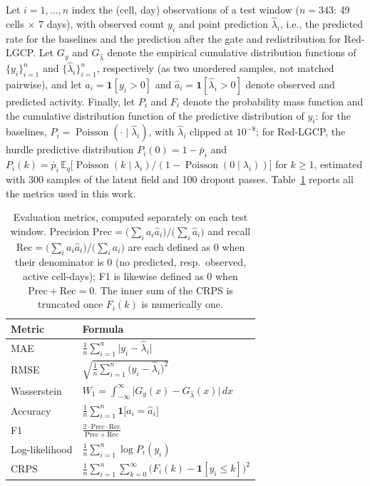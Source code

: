 Let $i=1,\dots,n$ index the (cell, day) observations of a test window ($n=343$: 49 cells $\times$ 7 days), with observed count $y_i$ and point prediction $\hat\lambda_i$, i.e., the predicted rate for the baselines and the prediction after the gate and redistribution for Red-LGCP. Let $G_y$ and $G_{\hat\lambda}$ denote the empirical cumulative distribution functions of $\{y_i\}_{i=1}^n$ and $\{\hat\lambda_i\}_{i=1}^n$, respectively (as two unordered samples, not matched pairwise), and let $a_i=\mathbf{1}[y_i>0]$ and $\hat a_i=\mathbf{1}[\hat\lambda_i>0]$ denote observed and predicted activity. Finally, let $P_i$ and $F_i$ denote the probability mass function and the cumulative distribution function of the predictive distribution of $y_i$: for the baselines, $P_i=\operatorname{Poisson}(\cdot\mid\hat\lambda_i)$, with $\hat\lambda_i$ clipped at $10^{-8}$; for Red-LGCP, the hurdle predictive distribution $P_i(0)=1-\bar p_i$ and $P_i(k)=\bar p_i\,\mathbb{E}_q\bigl[\operatorname{Poisson}(k\mid\lambda_i)/(1-\operatorname{Poisson}(0\mid\lambda_i))\bigr]$ for $k\geq1$, estimated with 300 samples of the latent field and 100 dropout passes. Table~\ref{tab:metric-formulas} reports all the metrics used in this work.

\begin{table}[h]
\centering
\begin{tabular}{ll}
\toprule
Metric & Formula \\
\midrule
MAE & $\displaystyle \frac{1}{n}\sum_{i=1}^n \big|y_i - \hat\lambda_i\big|$ \\[12pt]
RMSE & $\displaystyle \sqrt{\frac{1}{n}\sum_{i=1}^n \big(y_i - \hat\lambda_i\big)^2}$ \\[12pt]
Wasserstein & $\displaystyle W_1 = \int_{-\infty}^{\infty} \big|G_y(x) - G_{\hat\lambda}(x)\big|\, dx$ \\[12pt]
Accuracy & $\displaystyle \frac{1}{n}\sum_{i=1}^n \mathbf{1}\big[a_i = \hat a_i\big]$ \\[12pt]
F1 & $\displaystyle \frac{2 \cdot \mathrm{Prec} \cdot \mathrm{Rec}}{\mathrm{Prec} + \mathrm{Rec}}$ \\[12pt]
Log-likelihood & $\displaystyle \frac{1}{n}\sum_{i=1}^n \log P_i(y_i)$ \\[12pt]
CRPS & $\displaystyle \frac{1}{n}\sum_{i=1}^n \sum_{k=0}^{\infty} \big(F_i(k) - \mathbf{1}[y_i \leq k]\big)^2$ \\
\bottomrule
\end{tabular}
\caption{Evaluation metrics, computed separately on each test window. Precision $\mathrm{Prec} = \big(\sum_i a_i \hat a_i\big) / \big(\sum_i \hat a_i\big)$ and recall $\mathrm{Rec} = \big(\sum_i a_i \hat a_i\big) / \big(\sum_i a_i\big)$ are each defined as 0 when their denominator is 0 (no predicted, resp.\ observed, active cell-days); F1 is likewise defined as 0 when $\mathrm{Prec}+\mathrm{Rec}=0$. The inner sum of the CRPS is truncated once $F_i(k)$ is numerically one.}
\label{tab:metric-formulas}
\end{table}
